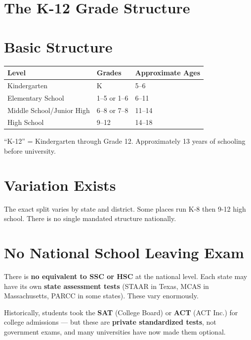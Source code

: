 \section{The K-12 Grade Structure}

\section{Basic Structure}

\begin{center}\small
	\begin{tabularx}{0.9\textwidth}{@{} l l X @{}}
		\toprule
		\textbf{Level}            & \textbf{Grades} & \textbf{Approximate Ages} \\
		\midrule
		Kindergarten              & K               & 5--6                      \\
		Elementary School         & 1--5 or 1--6    & 6--11                     \\
		Middle School/Junior High & 6--8 or 7--8    & 11--14                    \\
		High School               & 9--12           & 14--18                    \\
		\bottomrule
	\end{tabularx}
\end{center}


``K-12'' = Kindergarten through Grade 12. Approximately 13 years of schooling before university.

\section{Variation Exists}

The exact split varies by state and district. Some places run K-8 then 9-12 high school. There is no single mandated structure nationally.

\section{No National School Leaving Exam}

There is \textbf{no equivalent to SSC or HSC} at the national level. Each state may have its own \textbf{state assessment tests} (STAAR in Texas, MCAS in Massachusetts, PARCC in some states). These vary enormously.

Historically, students took the \textbf{SAT} (College Board) or \textbf{ACT} (ACT Inc.) for college admissions --- but these are \textbf{private standardized tests}, not government exams, and many universities have now made them optional.

